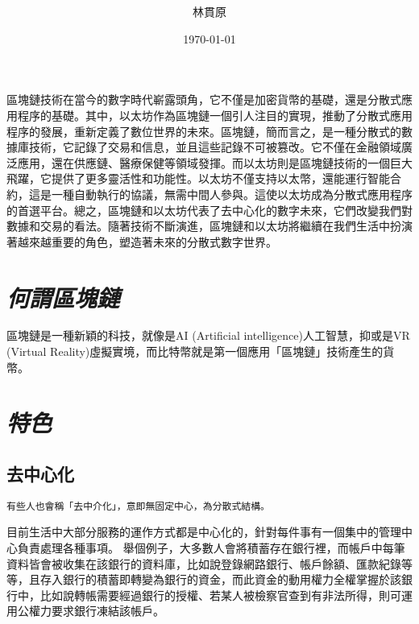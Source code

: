 \documentclass[12pt, a4paper]{article}
\title{ \XeLaTeX {\KT 的各種表現技巧}}	%
\author{{\KT 林貫原}}				%
\date{{\R \today }}
\begin{document}
\renewcommand{\tablename}{表}	
\renewcommand{\figurename}{圖}
\maketitle
\fontsize{12}{22pt}\selectfont 

\BB 區塊鏈技術在當今的數字時代嶄露頭角，它不僅是加密貨幣的基礎，還是分散式應用程序的基礎。其中，以太坊作為區塊鏈一個引人注目的實現，推動了分散式應用程序的發展，重新定義了數位世界的未來。區塊鏈，簡而言之，是一種分散式的數據庫技術，它記錄了交易和信息，並且這些記錄不可被篡改。它不僅在金融領域廣泛應用，還在供應鏈、醫療保健等領域發揮。而以太坊則是區塊鏈技術的一個巨大飛躍，它提供了更多靈活性和功能性。以太坊不僅支持以太幣，還能運行智能合約，這是一種自動執行的協議，無需中間人參與。這使以太坊成為分散式應用程序的首選平台。總之，區塊鏈和以太坊代表了去中心化的數字未來，它們改變我們對數據和交易的看法。隨著技術不斷演進，區塊鏈和以太坊將繼續在我們生活中扮演著越來越重要的角色，塑造著未來的分散式數字世界。
\section{\textit {\SK 何謂區塊鏈}}
區塊鏈是一種新穎的科技，就像是AI (Artificial intelligence)人工智慧，抑或是VR (Virtual Reality)虛擬實境，而比特幣就是第一個應用「區塊鏈」技術產生的貨幣。

\section{\textsl {\SK 特色}}

\subsection{\textbf {\SK 去中心化}}
\bigskip
	\begin{lstlisting}
有些人也會稱「去中介化」，意即無固定中心，為分散式結構。
	\end{lstlisting}
\bigskip
目前生活中大部分服務的運作方式都是中心化的，針對每件事有一個集中的管理中心負責處理各種事項。
舉個例子，大多數人會將積蓄存在銀行裡，而帳戶中每筆資料皆會被收集在該銀行的資料庫，比如說登錄網路銀行、帳戶餘額、匯款紀錄等等，且存入銀行的積蓄即轉變為銀行的資金，而此資金的動用權力全權掌握於該銀行中，比如說轉帳需要經過銀行的授權、若某人被檢察官查到有非法所得，則可運用公權力要求銀行凍結該帳戶。
\end{document}
